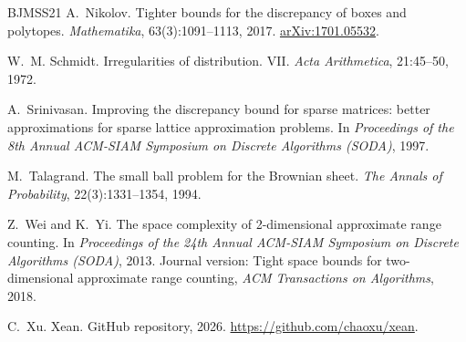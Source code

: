 \documentclass[11pt,letterpaper]{article}
\newcommand{\1}{\mathbf{1}}
\begin{document}
\begin{thebibliography}{BJMSS21}
A.~Nikolov.
\newblock Tighter bounds for the discrepancy of boxes and polytopes.
\newblock \emph{Mathematika}, 63(3):1091--1113, 2017. \href{https://arxiv.org/abs/1701.05532}{arXiv:1701.05532}.

W.~M. Schmidt.
\newblock Irregularities of distribution. VII.
\newblock \emph{Acta Arithmetica}, 21:45--50, 1972.

A.~Srinivasan.
\newblock Improving the discrepancy bound for sparse matrices: better approximations for sparse lattice approximation problems.
\newblock In \emph{Proceedings of the 8th Annual ACM-SIAM Symposium on Discrete Algorithms (SODA)}, 1997.

M.~Talagrand.
\newblock The small ball problem for the Brownian sheet.
\newblock \emph{The Annals of Probability}, 22(3):1331--1354, 1994.

Z.~Wei and K.~Yi.
\newblock The space complexity of 2-dimensional approximate range counting.
\newblock In \emph{Proceedings of the 24th Annual ACM-SIAM Symposium on Discrete Algorithms (SODA)}, 2013. Journal version: Tight space bounds for two-dimensional approximate range counting, \emph{ACM Transactions on Algorithms}, 2018.

C.~Xu.
\newblock Xean.
\newblock GitHub repository, 2026. \url{https://github.com/chaoxu/xean}.

\end{thebibliography}
\end{document}
